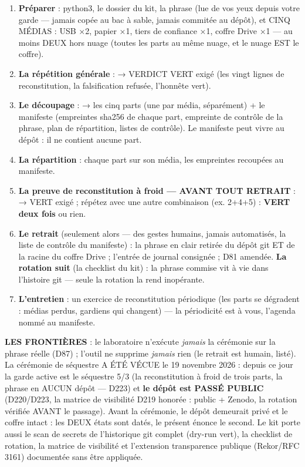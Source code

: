 \begin{enumerate}
\item \textbf{Préparer} : python3, le dossier du kit, la phrase (lue de vos
yeux depuis votre garde — jamais copée au bac à sable, jamais commitée au
dépôt), et CINQ MÉDIAS : USB ×2, papier ×1, tiers de confiance ×1,
coffre Drive ×1 — au moins DEUX hors nuage (toutes les parts au même
nuage, et le nuage EST le coffre).
\item \textbf{La répétition générale} :  → VERDICT VERT
exigé (les vingt lignes de reconstitution, la falsification refusée,
l'honnête vert).
\item \textbf{Le découpage} :  → les
cinq parts (une par média, séparément) + le manifeste (empreintes sha256
de chaque part, empreinte de contrôle de la phrase, plan de répartition,
listes de contrôle). Le manifeste peut vivre au dépôt : il ne contient
aucune part.
\item \textbf{La répartition} : chaque part sur son média, les empreintes
recoupées au manifeste.
\item \textbf{La preuve de reconstitution à froid — AVANT TOUT RETRAIT} :
 → VERT exigé ; répétez
avec une autre combinaison (ex. 2+4+5) : \textbf{VERT deux fois} ou rien.
\item \textbf{Le retrait} (seulement alors — des gestes humains, jamais
automatisés, la liste de contrôle du manifeste) : la phrase en clair
retirée du dépôt git ET de la racine du coffre Drive ; l'entrée de journal
consignée ; D81 amendée. \textbf{La rotation suit} (la checklist du kit) :
la phrase commise vit à vie dans l'histoire git — seule la rotation la
rend inopérante.
\item \textbf{L'entretien} : un exercice de reconstitution périodique (les
parts se dégradent : médias perdus, gardiens qui changent) — la périodicité
est à vous, l'agenda nommé au manifeste.
\end{enumerate}

\textbf{LES FRONTIÈRES} : le laboratoire n'exécute \emph{jamais} la
cérémonie sur la phrase réelle (D87) ; l'outil ne supprime \emph{jamais}
rien (le retrait est humain, listé). La cérémonie de séquestre A ÉTÉ
VÉCUE le 19 novembre 2026 : depuis ce jour la garde active est le
séquestre 5/3 (la reconstitution à froid de trois parts, la phrase en
AUCUN dépôt — D223) et \textbf{le dépôt est PASSÉ PUBLIC}
(D220/D223, la matrice de visibilité D219 honorée : public + Zenodo,
la rotation vérifiée AVANT le passage). Avant la cérémonie, le dépôt
demeurait privé et le coffre intact : les DEUX états sont datés, le
présent énonce le second. Le kit
porte aussi le scan de secrets de l'historique git complet (dry-run vert),
la checklist de rotation, la matrice de visibilité et l'extension
transparence publique (Rekor/RFC 3161) documentée sans être appliquée.

